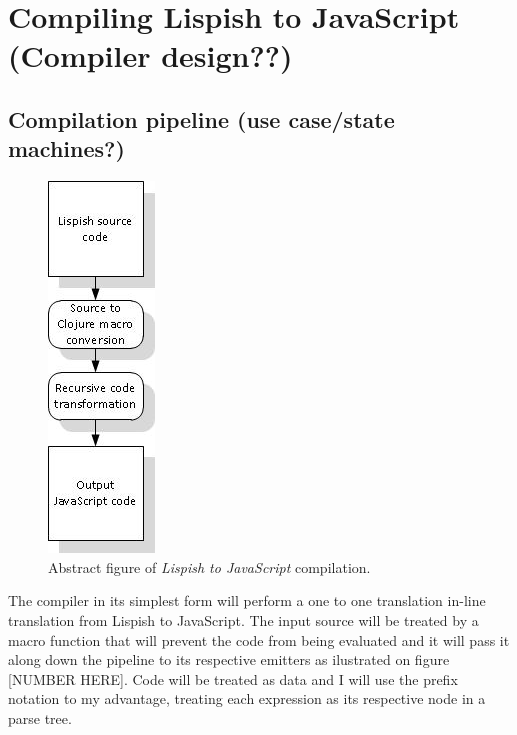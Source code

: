 \section{Compiling Lispish to JavaScript (Compiler design??)}

\subsection{Compilation pipeline (use case/state machines?)}

\begin{figure}[hb]
	\centering
	\includegraphics{Graphics/test.jpg}
	\caption[Abstract \textit{Lispish to JavaScript} compilation.]
   {Abstract figure of \textit{Lispish to JavaScript} compilation.}
\end{figure}

The compiler in its simplest form will perform a one to one translation in-line translation from Lispish to JavaScript. 
The input source will be treated by a macro function that will prevent the code from being evaluated and it will pass it along down the pipeline to its respective emitters as ilustrated on figure [NUMBER HERE]. Code will be treated as data and I will use the prefix notation to my advantage, treating each expression as its respective node in a parse tree. 
